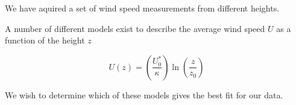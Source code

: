 We have aquired a set of wind speed measurements from different heights. 

A number of different models exist to describe the average wind speed $U$ as a
function of the height $z$

$$
U(z) = \left( \frac{U_0^*}{\kappa} \right) \ln \left( \frac{z}{z_0} \right)
$$

We wish to determine which of these models gives the best fit for our data. 








